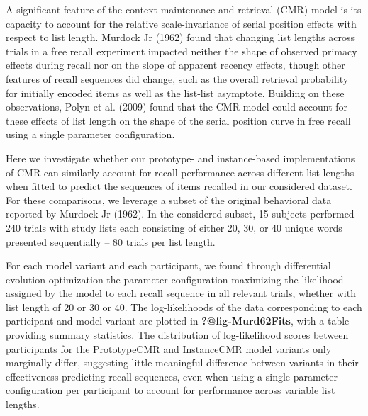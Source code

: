 \documentclass[
  letterpaper,
]{article}
\begin{document}
A significant feature of the context maintenance and retrieval (CMR)
model is its capacity to account for the relative scale-invariance of
serial position effects with respect to list length. Murdock Jr (1962)
found that changing list lengths across trials in a free recall
experiment impacted neither the shape of observed primacy effects during
recall nor on the slope of apparent recency effects, though other
features of recall sequences did change, such as the overall retrieval
probability for initially encoded items as well as the list-list
asymptote. Building on these observations, Polyn et al. (2009) found
that the CMR model could account for these effects of list length on the
shape of the serial position curve in free recall using a single
parameter configuration.

Here we investigate whether our prototype- and instance-based
implementations of CMR can similarly account for recall performance
across different list lengths when fitted to predict the sequences of
items recalled in our considered dataset. For these comparisons, we
leverage a subset of the original behavioral data reported by Murdock Jr
(1962). In the considered subset, 15 subjects performed 240 trials with
study lists each consisting of either 20, 30, or 40 unique words
presented sequentially -- 80 trials per list length.

For each model variant and each participant, we found through
differential evolution optimization the parameter configuration
maximizing the likelihood assigned by the model to each recall sequence
in all relevant trials, whether with list length of 20 or 30 or 40. The
log-likelihoods of the data corresponding to each participant and model
variant are plotted in \textbf{?@fig-Murd62Fits}, with a table providing
summary statistics. The distribution of log-likelihood scores between
participants for the PrototypeCMR and InstanceCMR model variants only
marginally differ, suggesting little meaningful difference between
variants in their effectiveness predicting recall sequences, even when
using a single parameter configuration per participant to account for
performance across variable list lengths.
\end{document}
